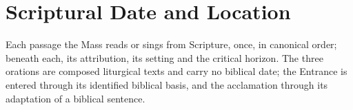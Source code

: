 \section{Scriptural Date and Location}
\label{sec:date-location}
{\small Each passage the Mass reads or sings from Scripture, once, in
canonical order; beneath each, its attribution, its setting and the critical
horizon. The three orations are composed liturgical texts and carry no
biblical date; the Entrance is entered through its identified biblical basis,
and the acclamation through its adaptation of a biblical sentence.\par}

